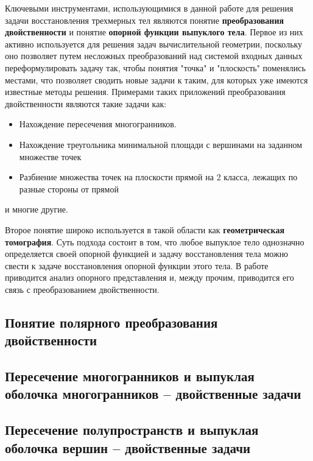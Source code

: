 \documentclass[a4paper, 12pt, titlepage]{article}
\theoremstyle{definition}
\theoremstyle{plain}
\theoremstyle{plain}
\begin{document}
Ключевыми инструментами, использующимися в данной работе для решения задачи
восстановления трехмерных тел являются понятие \textbf{преобразования
двойственности} и понятие \textbf{опорной функции выпуклого тела}. Первое из
них активно используется для решения задач вычислительной геометрии, поскольку
оно позволяет путем несложных преобразований над системой входных данных
переформулировать задачу так, чтобы понятия "точка" и "плоскость" поменялись
местами, что позволяет сводить новые задачи к таким, для которых уже имеются
известные методы решения. Примерами таких приложений преобразования
двойственности являются такие задачи как:

\begin{itemize}
 \item Нахождение пересечения многогранников.
 \item Нахождение треугольника минимальной площади с вершинами на заданном
множестве точек \cite{journals/BIT/ChazelleG1985}
 \item Разбиение множества точек на плоскости прямой на 2 класса, лежащих по
 разные стороны от прямой
\end{itemize}

и многие другие.

Второе понятие широко используется в такой области как \textbf{геометрическая
томография}. Суть подхода состоит в том, что любое выпуклое тело однозначно
определяется своей опорной функцией и задачу восстановления тела можно свести к
задаче восстановления опорной функции этого тела. В работе
\cite{journals/cviu/GhoshK98} приводится анализ опорного представления и, между 
прочим, приводится его связь с преобразованием двойственности.

\subsection{Понятие полярного преобразования двойственности}

\subsection{Пересечение многогранников и выпуклая оболочка многогранников --
двойственные задачи}

\subsection{Пересечение полупространств и выпуклая оболочка вершин -- 
двойственные задачи}
\end{document}
